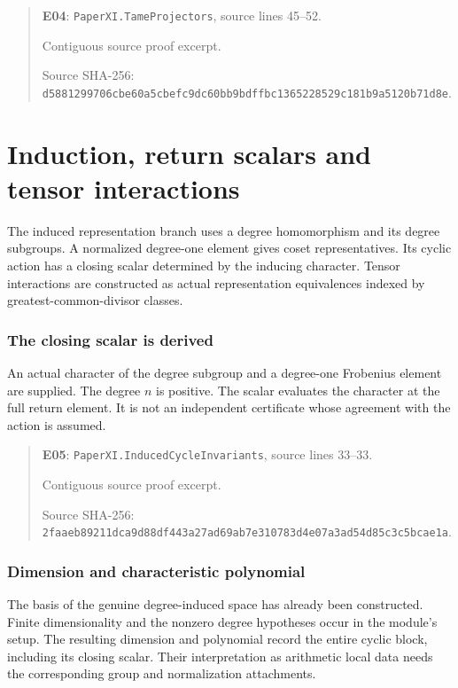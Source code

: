 \documentclass[10pt,oneside]{book}
\begin{document}
\begin{quote}\footnotesize\textbf{E04}: \nolinkurl{PaperXI.TameProjectors}, source lines 45--52.\par Contiguous source proof excerpt.\par Source SHA-256: {\scriptsize\texttt{d5881299706cbe60a5cbefc9dc60bb9bdffbc1365228529c181b9a5120b71d8e}}.\end{quote}


\chapter{Induction, return scalars and tensor interactions}
The induced representation branch uses a degree homomorphism and its degree subgroups. A normalized degree-one element gives coset representatives. Its cyclic action has a closing scalar determined by the inducing character. Tensor interactions are constructed as actual representation equivalences indexed by greatest-common-divisor classes.

\subsection{The closing scalar is derived}
\label{guide:E05}
An actual character of the degree subgroup and a degree-one Frobenius element are supplied. The degree \(n\) is positive.
The scalar evaluates the character at the full return element. It is not an independent certificate whose agreement with the action is assumed.

\begin{quote}\footnotesize\textbf{E05}: \nolinkurl{PaperXI.InducedCycleInvariants}, source lines 33--33.\par Contiguous source proof excerpt.\par Source SHA-256: {\scriptsize\texttt{2faaeb89211dca9d88df443a27ad69ab7e310783d4e07a3ad54d85c3c5bcae1a}}.\end{quote}


\subsection{Dimension and characteristic polynomial}
\label{guide:E06}
The basis of the genuine degree-induced space has already been constructed. Finite dimensionality and the nonzero degree hypotheses occur in the module's setup.
The resulting dimension and polynomial record the entire cyclic block, including its closing scalar. Their interpretation as arithmetic local data needs the corresponding group and normalization attachments.
\end{document}
